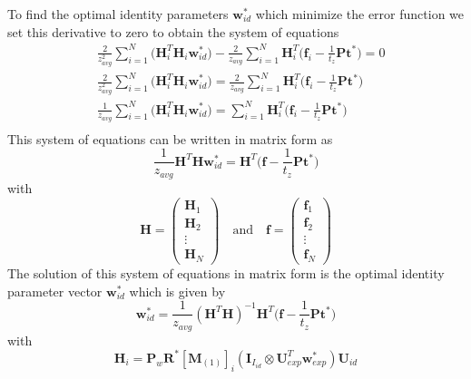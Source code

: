 \documentclass[11pt,a4paper]{report}
\begin{document}
To find the optimal identity parameters $\mathbf{w}_{id}^*$ which minimize the error function we set
this derivative to zero to obtain the system of equations 
\begin{align*}
&\frac{2}{z_{avg}^2}\sum_{i=1}^N\bigl(
\mathbf{H}_i^T\mathbf{H}_i\mathbf{w}^*_{id}\bigr)
-
\frac{2}{z_{avg}}\sum_{i=1}^N \mathbf{H}_i^T\bigl(\mathbf{f}_i -
\frac{1}{t_z}\mathbf{P}\mathbf{t}^*\bigr) = 0\\
&\frac{2}{z_{avg}^2}\sum_{i=1}^N\bigl(
\mathbf{H}_i^T\mathbf{H}_i\mathbf{w}^*_{id}\bigr)
=
\frac{2}{z_{avg}}\sum_{i=1}^N \mathbf{H}_i^T\bigl(\mathbf{f}_i -
\frac{1}{t_z}\mathbf{P}\mathbf{t}^*\bigr)\\
&\frac{1}{z_{avg}}\sum_{i=1}^N\bigl(
\mathbf{H}_i^T\mathbf{H}_i\mathbf{w}^*_{id}\bigr)
=
\sum_{i=1}^N \mathbf{H}_i^T\bigl(\mathbf{f}_i -
\frac{1}{t_z}\mathbf{P}\mathbf{t}^*\bigr)\\
\end{align*}
This system of equations can be written in matrix form as
\begin{equation}
\frac{1}{z_{avg}}\mathbf{H}^T\mathbf{H}\mathbf{w}^*_{id} =
\mathbf{H}^T\bigl(\mathbf{f} - \frac{1}{t_z}\mathbf{P}\mathbf{t}^*\bigr)
\end{equation}
with
\begin{equation}
\mathbf{H} = 
\begin{pmatrix}
\mathbf{H}_1\\
\mathbf{H}_2\\
\vdots\\
\mathbf{H}_N
\end{pmatrix}
\quad \mathrm{and} \quad 
\mathbf{f} = 
\begin{pmatrix}
\mathbf{f}_1\\
\mathbf{f}_2\\
\vdots\\
\mathbf{f}_N
\end{pmatrix}
\end{equation}
The solution of this system of equations in matrix form is the optimal identity parameter
vector $\mathbf{w}^*_{id}$ which is given by
\begin{equation}
\mathbf{w}^*_{id} = \frac{1}{z_{avg}}(\mathbf{H}^T\mathbf{H})^{-1}\mathbf{H}^T\bigl(\mathbf{f} - \frac{1}{t_z}\mathbf{P}\mathbf{t}^*\bigr)
\end{equation}
with
\begin{equation*}
\mathbf{H}_i = \mathbf{P}_w\mathbf{R}^*[\mathbf{M}_{(1)}]_{i}(\mathbf{I}_{I_{id}}
\otimes \mathbf{U}_{exp}^T\mathbf{w}^*_{exp})\mathbf{U}_{id}
\end{equation*}
\end{document}
